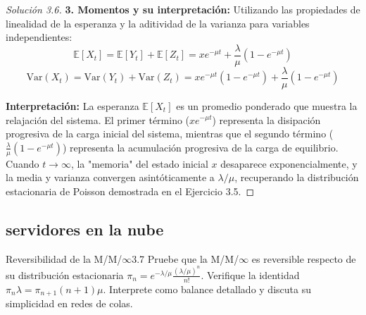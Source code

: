 \documentclass[10pt,a4paper]{article}
\begin{document}
\begin{proof}[Solución 3.6]
    \textbf{3. Momentos y su interpretación:}
    Utilizando las propiedades de linealidad de la esperanza y la aditividad de la varianza para variables independientes:
    $$ \mathbb{E}[X_t] = \mathbb{E}[Y_t] + \mathbb{E}[Z_t] = x e^{-\mu t} + \frac{\lambda}{\mu}(1 - e^{-\mu t}) $$
    $$ \text{Var}(X_t) = \text{Var}(Y_t) + \text{Var}(Z_t) = x e^{-\mu t}(1 - e^{-\mu t}) + \frac{\lambda}{\mu}(1 - e^{-\mu t}) $$
    
    \textbf{Interpretación:} La esperanza $\mathbb{E}[X_t]$ es un promedio ponderado que muestra la relajación del sistema. El primer término ($x e^{-\mu t}$) representa la disipación progresiva de la carga inicial del sistema, mientras que el segundo término ($\frac{\lambda}{\mu}(1 - e^{-\mu t})$) representa la acumulación progresiva de la carga de equilibrio. Cuando $t \to \infty$, la "memoria" del estado inicial $x$ desaparece exponencialmente, y la media y varianza convergen asintóticamente a $\lambda/\mu$, recuperando la distribución estacionaria de Poisson demostrada en el Ejercicio 3.5.
\end{proof}

\newpage

\subsection{servidores en la nube}

\begin{ejercicio}{Reversibilidad de la M/M/$\infty$}{3.7}
    Pruebe que la M/M/$\infty$ es reversible respecto de su distribución estacionaria $\pi_n = e^{-\lambda/\mu} \frac{(\lambda/\mu)^n}{n!}$. Verifique la identidad $\pi_n \lambda = \pi_{n+1}(n+1)\mu$. Interprete como balance detallado y discuta su simplicidad en redes de colas.
\end{ejercicio}
\end{document}
